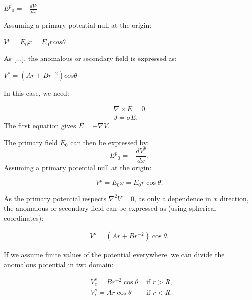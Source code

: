\documentclass[11pt,letterpaper,leqno]{amsart}
\numberwithin{equation}{section}
\begin{document}
${E^p}_0=-\frac{dV^p}{dx}$

Assuming a primary potential null at the origin:

$V^p=E_0x=E_0 r cos\theta$

As [...], the anomalous or secondary field is expressed as:

$V^s=(A r + B r^{-2}) cos\theta$

\vspace{0.4cm}

 \vspace{0.4cm}



In this case, we need:

\begin{equation}
\begin{aligned}
\nabla \times E =0\\
J=\sigma E.
\end{aligned}
\end{equation}
The first equation gives $E=-\nabla V$.


The primary field $E_0$ can then be expressed by:
\begin{equation}
{E^p}_0=-\frac{dV^p}{dx}.
\end{equation}
Assuming a primary potential null at the origin:

 \begin{equation}
V^p=E_0x=E_0 r \cos\theta.
\end{equation}



As the primary potential respects $\nabla^2 V=0 $, as only a dependence in $x$ direction, the anomalous or secondary field can be expressed as (using spherical coordinates):

\begin{equation}
\begin{aligned}
V^s=(A r + B r^{-2}) \cos\theta.
\end{aligned}
\end{equation}


If we assume finite  values of the potential everywhere, we can divide the anomalous potential in two domain:


\begin{equation}
\begin{aligned}
&V^s_e=B r^{-2} \cos\theta  & \text{ if } r>R, \\
&V^s_i=A r \cos\theta & \text{ if }  r<R.
\end{aligned}
\end{equation}
\end{document}
